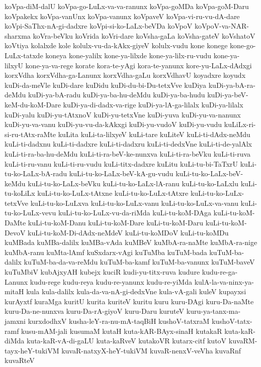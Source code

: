 {koVpa-diM-dalU
koVpa-go-LuLx-va-va-ranunx
koVpa-goMDa
koVpa-goM-Daru
koVpakekx
koVpa-vanUnx
koVpa-vanunx
koVpaveV
koVpa-vi-ru-vu-dA-dare
koVpi-SaThx-nA-gi-dadxre
koVpi-si-ko-LaLx-beVDa
koVpoV
koVpoV-va-NAR-sharxma
koVra-beVku
koVrida
koVri-dare
koVsha-gaLa
koVsha-gateV
koVshatoV
koVtiya
kolalxde
kole
kolulx-vu-da-kAkx-giyeV
kolulx-vudu
kone
konege
kone-go-LuLx-tatxde
koneya
kone-yalilx
kone-ya-lilxde
kone-ya-lilx-ru-vudu
kone-ya-lilxyU
kone-ya-va-rege
korate
kora-te-yAgi
kora-te-yanunx
kore-yu-LaLx-dAdxgi
korxVdha
korxVdha-ga-Lanunx
korxVdha-gaLu
korxVdhavU
koyadxre
koyudx
kuDi-da-meVle
kuDi-dare
kuDidu
kuDi-du-bi-Du-tetxVve
kuDiya
kuDi-ya-bA-ra-deMdu
kuDi-ya-bA-radu
kuDi-ya-ba-hu-deMdu
kuDi-ya-ba-hudu
kuDi-ya-beV-keM-du-koM-Dare
kuDi-ya-di-dadx-va-rige
kuDi-ya-lA-ga-lilalx
kuDi-ya-lilalx
kuDi-yalu
kuDi-yu-tAtxnoV
kuDi-yu-tetxVne
kuDi-yuva
kuDi-yu-va-nanunx
kuDi-yu-va-vanu
kuDi-yu-vu-da-kAkxgi
kuDi-yu-vudoV
kuDi-yu-vudu
kuLiLx-ri-si-ru-tAtx-raMte
kuLita
kuLi-ta-lilxyeV
kuLi-tare
kuLiteV
kuLi-ti-dAdx-neMdu
kuLi-ti-dadxnu
kuLi-ti-dadxre
kuLi-ti-dadxru
kuLi-ti-dedxVne
kuLi-ti-de-yalAlx
kuLi-ti-ra-ba-hu-deMdu
kuLi-ti-ra-beV-ke-nunxva
kuLi-ti-ra-beVku
kuLi-ti-ruva
kuLi-ti-ru-vanu
kuLi-ti-ru-vudu
kuLi-titx-dadxre
kuLitu
kuLi-tu-bi-TaTxrU
kuLi-tu-ko-LaLx-bA-radu
kuLi-tu-ko-LaLx-beV-kA-gu-vudu
kuLi-tu-ko-LaLx-beV-keMdu
kuLi-tu-ko-LaLx-beVku
kuLi-tu-ko-LaLx-lA-ranu
kuLi-tu-ko-LaLxlu
kuLi-tu-koLiLx
kuLi-tu-ko-LuLx-tAtxne
kuLi-tu-ko-LuLx-tAtxre
kuLi-tu-ko-LuLx-tetxVve
kuLi-tu-ko-LuLxva
kuLi-tu-ko-LuLx-vanu
kuLi-tu-ko-LuLx-va-vanu
kuLi-tu-ko-LuLx-vevu
kuLi-tu-ko-LuLx-vu-da-riMda
kuLi-tu-koM-DAga
kuLi-tu-koM-DaMte
kuLi-tu-koM-Danu
kuLi-tu-koM-Dare
kuLi-tu-koM-Daru
kuLi-tu-koM-DevoV
kuLi-tu-koM-Di-dAdx-neMdeV
kuLi-tu-koMDoV
kuLi-tu-koMDu
kuMBada
kuMBa-dalilx
kuMBa-vAda
kuMBeV
kuMbA-ra-naMte
kuMbA-ra-nige
kuMbA-ranu
kuMta-lAmf
kuSxdarx-vAgi
kuTuMba
kuTuM-bada
kuTuM-ba-dalilx
kuTuM-ba-da-va-reMdu
kuTuM-ba-kamf
kuTuM-ba-vanunx
kuTuM-baveV
kuTuMbiV
kubAjxyAH
kubejx
kuciR
kudi-yu-titx-ruva
kudure
kudu-re-ga-Lanunx
kudu-rege
kudu-reya
kudu-re-yanunx
kudu-re-yiMda
kulA-la-va-ninx-ya-mitaH
kula
kula-dalilx
kula-da-va-nA-gi-dedxVne
kula-vA-gali
kuleV
kupayxsi
kurAyxtf
kuraMga
kuritU
kurita
kuriteV
kuritu
kuru
kuru-DAgi
kuru-Da-naMte
kuru-Da-ne-nunxva
kuru-Da-rA-giyoV
kuru-Daru
kuruteV
kuru-ya-tanx-ma-jamxni
kurxdodhxV
kusha-leY-ra-nu-mA-taqBiH
kushoV-tatxraM
kushoV-tatx-ramf
kusu-mAM-jali
kusumaM
kutaH
kuta-kAR-BAyx-sinaH
kutakaR
kuta-kaR-diMda
kuta-kaR-vA-di-gaLU
kuta-kaRveV
kutakoVR
kutarx-citf
kutoV
kuvaRM-tayx-heY-tukiVM
kuvaR-natxyX-heY-tukiVM
kuvaR-nenxV-veVha
kuvaRnf
kuvaRteV
}
